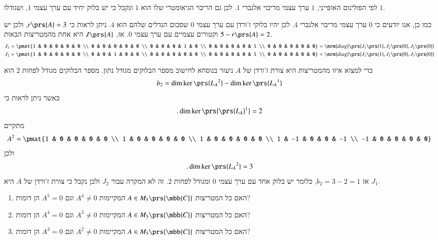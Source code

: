 \documentclass[a4paper,10pt,oneside,openany]{article}
\begin{document}
\begin{solution}
לפי הפולינום האופייני,
$1$
ערך עצמי מריבוי אלגברי
$1$.
לכן גם הריבוי הגיאומטרי שלו הוא
$1$
ונקבל כי יש בלוק יחיד עם ערך עצמי
$1$,
ושגודלו
$1$.

כמו כן, אנו יודעים כי
$0$
ערך עצמי מריבוי אלגברי
$4$.
לכן יהיו בלוקי ז'ורדן עם ערך עצמי
$0$
שסכום הגדלים שלהם הוא
$4$.
ניתן לראות כי
$r\prs{A} = 3$,
ולכן יש
$5 - r\prs{A} = 2$
וקטורים עצמיים עם ערך עצמי
$0$.
אז, $J\prs{A}$
היא אחת מהמטריצות הבאות.
\begin{align*}
J_1 &= \pmat{1 & 0 & 0 & 0 & 0 \\ 0 & 0 & 0 & 0 & 0 \\ 0 & 0 & 0 & 1 & 0 \\ 0 & 0 & 0 & 0 & 1 \\ 0 & 0 & 0 & 0 & 0} = \mrm{diag}\prs{J_1\prs{1}, J_2\prs{0}, J_2\prs{0}} \\
J_2 &= \pmat{1 & 0 & 0 & 0 & 0 \\ 0 & 0 & 1 & 0 & 0 \\ 0 & 0 & 0 & 0 & 0 \\ 0 & 0 & 0 & 0 & 1 \\ 0 & 0 & 0 & 0 & 0} = \mrm{diag}\prs{J_1\prs{1}, J_1\prs{0}, J_3\prs{0}}
\end{align*}

כדי למצוא איזו מהמטריצות היא צורת ז'ורדן של
$A$
ניעזר בנוסחא לחישוב מספר הבלוקים מגודל נתון.
מספר הבלוקים מגודל לפחות
$2$
הוא
\[b_2 = \dim \ker\prs{{L_A}^2} - \dim \ker\prs{{L_A}^1}\]
כאשר ניתן לראות כי
\[\text{.} \dim \ker\prs{\prs{L_A}^1} = 2\]
מתקיים
\[A^2 = \pmat{1 & 0 & 0 & 0 & 0 \\ 1 & 0 & 0 & 0 & 0 \\ 1 & 0 & 0 & 0 & 0 \\ 1 & -1 & 0 & 0 & -1 \\ -1 & 0 & 0 & 0 & 0}\]
ולכן
\[\text{.} \dim \ker\prs{{L_A}^2} = 3\]
אז
$b_2 = 3 - 2 = 1$,
כלומר יש בלוק אחד עם ערך עצמי
$0$
ומגודל לפחות
$2$.
זה לא המקרה עבור
$J_2$
ולכן נקבל כי צורת ז'ורדן של
$A$
היא
$J_1$.
\end{solution}

\begin{exercise}
\begin{enumerate}
\item האם כל המטריצות
$A \in M_5\prs{\mbb{C}}$
המקיימות
$A^4 \neq 0$
וגם
$A^5 = 0$
הן דומות?

\item האם כל המטריצות
$A \in M_5\prs{\mbb{C}}$
המקיימות
$A^3 \neq 0$
וגם
$A^4 = 0$
הן דומות?

\item האם כל המטריצות
$A \in M_5\prs{\mbb{C}}$
המקיימות
$A^2 \neq 0$
וגם
$A^3 = 0$
הן דומות?
\end{enumerate}
\end{exercise}
\end{document}
